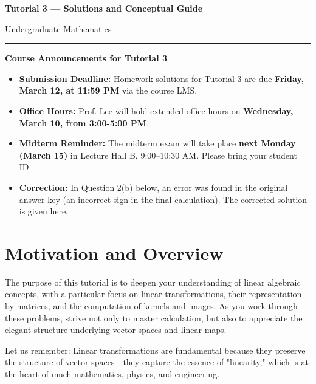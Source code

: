 \documentclass[12pt]{article}
\theoremstyle{definition}
\theoremstyle{plain}
\newenvironment{administrative_note}
  {\vspace{1em}\noindent\setlength{\fboxrule}{1pt}\begin{Sbox}\begin{minipage}{0.98\textwidth}\color{blue}\sffamily\large}
  {\end{minipage}\end{Sbox}\fbox{\TheSbox}\vspace{1em}}
\begin{document}
\begin{center}
    {\LARGE \textbf{Tutorial 3 — Solutions and Conceptual Guide}} \\[1ex]
    {\large Undergraduate Mathematics \\ [0.5ex] \hrule}
\end{center}

\vspace{1em}


\begin{administrative_note}
\textbf{Course Announcements for Tutorial 3}
\begin{itemize}
    \item \textbf{Submission Deadline:} Homework solutions for Tutorial 3 are due \textbf{Friday, March 12, at 11:59 PM} via the course LMS.
    \item \textbf{Office Hours:} Prof. Lee will hold extended office hours on \textbf{Wednesday, March 10, from 3:00-5:00 PM}.
    \item \textbf{Midterm Reminder:} The midterm exam will take place \textbf{next Monday (March 15)} in Lecture Hall B, 9:00–10:30 AM. Please bring your student ID.
    \item \textbf{Correction:} In Question 2(b) below, an error was found in the original answer key (an incorrect sign in the final calculation). The corrected solution is given here.
\end{itemize}
\end{administrative_note}


\section{Motivation and Overview}

The purpose of this tutorial is to deepen your understanding of linear algebraic concepts, with a particular focus on linear transformations, their representation by matrices, and the computation of kernels and images. As you work through these problems, strive not only to master calculation, but also to appreciate the elegant structure underlying vector spaces and linear maps.

Let us remember: Linear transformations are fundamental because they preserve the structure of vector spaces—they capture the essence of "linearity," which is at the heart of much mathematics, physics, and engineering.
\end{document}
